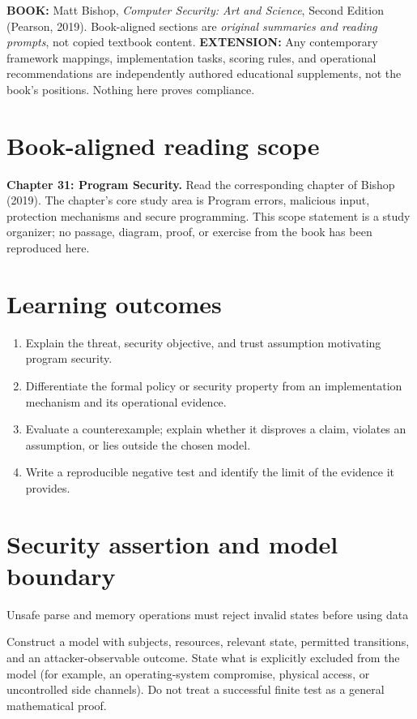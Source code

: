 \documentclass[10pt,letterpaper]{article}
\begin{document}
\makedoctocpage
\begin{notebox}
\textbf{BOOK:} Matt Bishop, \emph{Computer Security: Art and Science}, Second Edition (Pearson, 2019). Book-aligned sections are \emph{original summaries and reading prompts}, not copied textbook content.
\textbf{EXTENSION:} Any contemporary framework mappings, implementation tasks, scoring rules, and operational recommendations are independently authored educational supplements, not the book's positions. Nothing here proves compliance.
\end{notebox}
\section{Book-aligned reading scope}
\textbf{Chapter 31: Program Security.} Read the corresponding chapter of Bishop (2019). The chapter's core study area is Program errors, malicious input, protection mechanisms and secure programming. This scope statement is a study organizer; no passage, diagram, proof, or exercise from the book has been reproduced here.
\section{Learning outcomes}
\begin{enumerate}
\item Explain the threat, security objective, and trust assumption motivating program security.
\item Differentiate the formal policy or security property from an implementation mechanism and its operational evidence.
\item Evaluate a counterexample; explain whether it disproves a claim, violates an assumption, or lies outside the chosen model.
\item Write a reproducible negative test and identify the limit of the evidence it provides.
\end{enumerate}
\section{Security assertion and model boundary}
\begin{infobox}
Unsafe parse and memory operations must reject invalid states before using data
\end{infobox}
Construct a model with subjects, resources, relevant state, permitted transitions, and an attacker-observable outcome. State what is explicitly excluded from the model (for example, an operating-system compromise, physical access, or uncontrolled side channels). Do not treat a successful finite test as a general mathematical proof.
\end{document}
